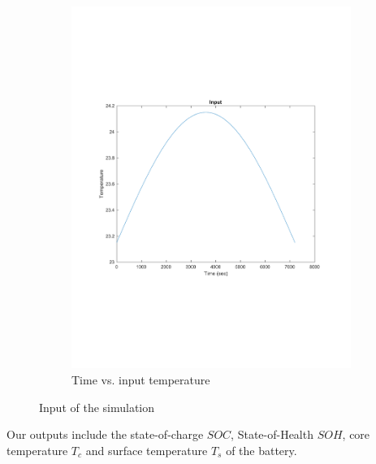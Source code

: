 \documentclass[10pt]{article}
\begin{document}
\begin{figure}[H]
\begin{subfigure}[t]{0.4\textwidth}
		\includegraphics[width=\textwidth]{temperature.pdf}
		\caption{Time vs. input temperature}
		\label{fig:inputTempr}
	\end{subfigure}

	\caption{Input of the simulation}\label{fig:input}
\end{figure}
\noindent Our outputs include the state-of-charge $SOC$, State-of-Health $SOH$, core temperature $T_c$ and surface temperature $T_s$ of the battery.
\end{document}
